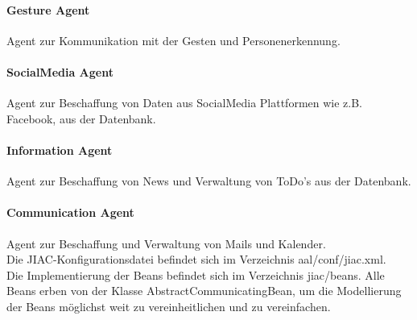\documentclass[10pt,a4paper]{report}
\newcommand{\code}[1]{{\fontfamily{cmvtt}\selectfont #1}}
\begin{document}
        \paragraph{Gesture Agent}
            Agent zur Kommunikation mit der Gesten und Personenerkennung. \\
        \paragraph{SocialMedia Agent}
            Agent zur Beschaffung von Daten aus
            SocialMedia Plattformen wie z.B. Facebook, aus der Datenbank. \\
        \paragraph{Information Agent}
            Agent zur Beschaffung von News und Verwaltung
            von ToDo's aus der Datenbank. \\
        \paragraph{Communication Agent}
            Agent zur Beschaffung und Verwaltung von
            Mails und Kalender. \\
      
        Die JIAC-Konfigurationsdatei befindet sich im Verzeichnis
        \code{aal/conf/jiac.xml}. \\
                
        
        Die Implementierung der Beans befindet sich im Verzeichnis
        \code{jiac/beans}. Alle Beans erben von der Klasse
        AbstractCommunicatingBean, um die Modellierung der Beans möglichst
        weit zu vereinheitlichen und zu vereinfachen. \\
\end{document}
